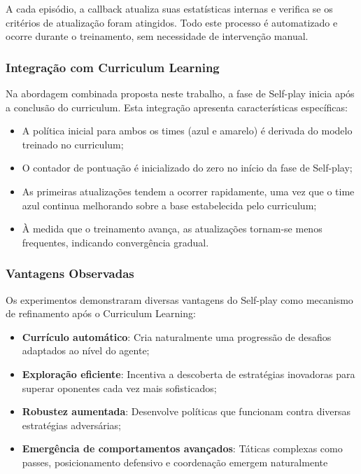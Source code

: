 A cada episódio, a callback atualiza suas estatísticas internas e verifica se os critérios de atualização foram atingidos. Todo este processo é automatizado e ocorre durante o treinamento, sem necessidade de intervenção manual.

\subsubsection{Integração com Curriculum Learning}

Na abordagem combinada proposta neste trabalho, a fase de Self-play inicia após a conclusão do curriculum. Esta integração apresenta características específicas:

\begin{itemize}
    \item A política inicial para ambos os times (azul e amarelo) é derivada do modelo treinado no curriculum;
    \item O contador de pontuação é inicializado do zero no início da fase de Self-play;
    \item As primeiras atualizações tendem a ocorrer rapidamente, uma vez que o time azul continua melhorando sobre a base estabelecida pelo curriculum;
    \item À medida que o treinamento avança, as atualizações tornam-se menos frequentes, indicando convergência gradual.
\end{itemize}

\subsubsection{Vantagens Observadas}

Os experimentos demonstraram diversas vantagens do Self-play como mecanismo de refinamento após o Curriculum Learning:

\begin{itemize}
    \item \textbf{Currículo automático}: Cria naturalmente uma progressão de desafios adaptados ao nível do agente;
    \item \textbf{Exploração eficiente}: Incentiva a descoberta de estratégias inovadoras para superar oponentes cada vez mais sofisticados;
    \item \textbf{Robustez aumentada}: Desenvolve políticas que funcionam contra diversas estratégias adversárias;
    \item \textbf{Emergência de comportamentos avançados}: Táticas complexas como passes, posicionamento defensivo e coordenação emergem naturalmente
\end{itemize}

